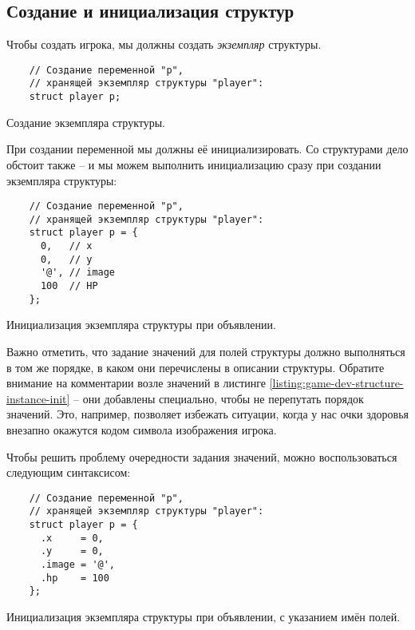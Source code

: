 \documentclass[../sparc.tex]{subfiles}
\begin{document}
\subsection{Создание и инициализация структур}

Чтобы создать игрока, мы должны создать \emph{экземпляр} структуры.

\begin{listing}[H]
  \begin{verbatim}
    // Создание переменной "p",
    // хранящей экземпляр структуры "player":
    struct player p;
  \end{verbatim}
  \caption{Создание экземпляра структуры.}
  \label{listing:game-dev-structure-instance}
\end{listing}

При создании переменной мы должны её инициализировать.  Со структурами дело
обстоит также -- и мы можем выполнить инициализацию сразу при создании экземпляра
структуры:

\begin{listing}[H]
  \begin{verbatim}
    // Создание переменной "p",
    // хранящей экземпляр структуры "player":
    struct player p = {
      0,   // x
      0,   // y
      '@', // image
      100  // HP
    };
  \end{verbatim}
  \caption{Инициализация экземпляра структуры при объявлении.}
  \label{listing:game-dev-structure-instance-init}
\end{listing}

Важно отметить, что задание значений для полей структуры должно выполняться в
том же порядке, в каком они перечислены в описании структуры.  Обратите внимание
на комментарии возле значений в листинге
\ref{listing:game-dev-structure-instance-init} -- они добавлены специально, чтобы
не перепутать порядок значений.  Это, например, позволяет избежать ситуации,
когда у нас очки здоровья внезапно окажутся кодом символа изображения игрока.

Чтобы решить проблему очередности задания значений, можно воспользоваться
следующим синтаксисом:

\begin{listing}[H]
  \begin{verbatim}
    // Создание переменной "p",
    // хранящей экземпляр структуры "player":
    struct player p = {
      .x     = 0,
      .y     = 0,
      .image = '@',
      .hp    = 100
    };
  \end{verbatim}
  \caption{Инициализация экземпляра структуры при объявлении, с указанием имён
    полей.}
  \label{listing:game-dev-structure-instance-init-names}
\end{listing}
\end{document}
